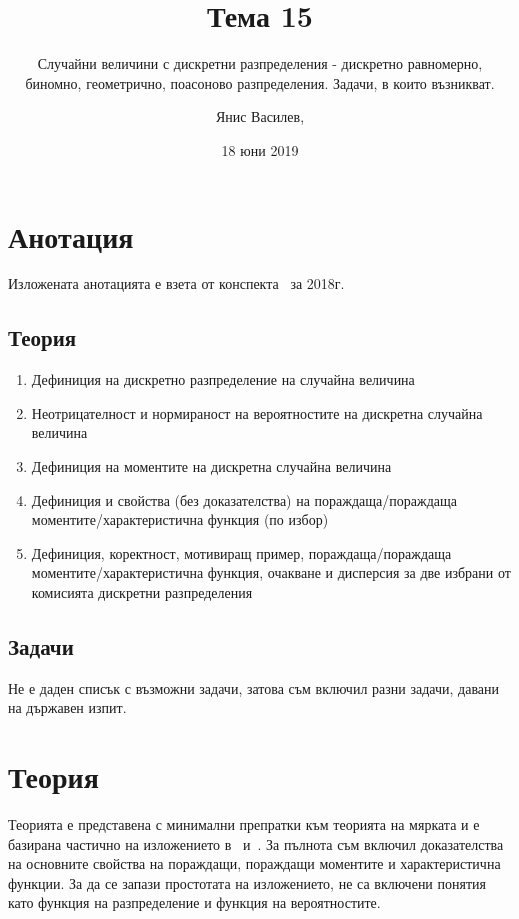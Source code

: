 \documentclass[numbers=endperiod, DIV=15, bibliography=totocnumbered]{scrartcl}
\title{Тема 15}
\subtitle{Случайни величини с дискретни разпределения - дискретно равномерно, биномно, геометрично, поасоново разпределения. Задачи, в които възникват.}
\author{Янис Василев, \Email{ianis@ivasilev.net}}
\date{18 юни 2019}
\begin{document}
\maketitle

\section{Анотация}

Изложената анотацията е взета от конспекта~\cite{Syllabus} за 2018г.

\subsection{Теория}

\begin{enumerate}
  \item Дефиниция на дискретно разпределение на случайна величина
  \item Неотрицателност и нормираност на вероятностите на дискретна случайна величина
  \item Дефиниция на моментите на дискретна случайна величина
  \item Дефиниция и свойства (без доказателства) на пораждаща/пораждаща моментите/характеристична функция (по избор)
  \item Дефиниция, коректност, мотивиращ пример, пораждаща/пораждаща моментите/характеристична функция, очакване и дисперсия за две избрани от комисията дискретни разпределения
\end{enumerate}

\subsection{Задачи}

Не е даден списък с възможни задачи, затова съм включил разни задачи, давани на държавен изпит.

\section{Теория}

Теорията е представена с минимални препратки към теорията на мярката и е базирана частично на изложението в~\cite{Borovkov} и~\cite{DimitrovYanev}. За пълнота съм включил доказателства на основните свойства на пораждащи, пораждащи моментите и характеристична функции. За да се запази простотата на изложението, не са включени понятия като функция на разпределение и функция на вероятностите.
\end{document}
